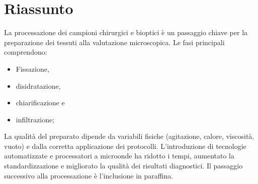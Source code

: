 \section{Riassunto}
La processazione dei campioni chirurgici e bioptici è un passaggio chiave per la preparazione dei tessuti alla valutazione microscopica.  
Le fasi principali comprendono:
\begin{itemize}
    \item Fissazione, 
    \item disidratazione, 
    \item chiarificazione e 
    \item infiltrazione;
\end{itemize}
La qualità del preparato dipende da variabili fisiche (agitazione, calore, viscosità, vuoto) e dalla corretta applicazione dei protocolli.  
L’introduzione di tecnologie automatizzate e processatori a microonde ha ridotto i tempi, aumentato la standardizzazione e migliorato la qualità dei risultati diagnostici.
Il passaggio successivo alla processazione è l'inclusione in paraffina.

